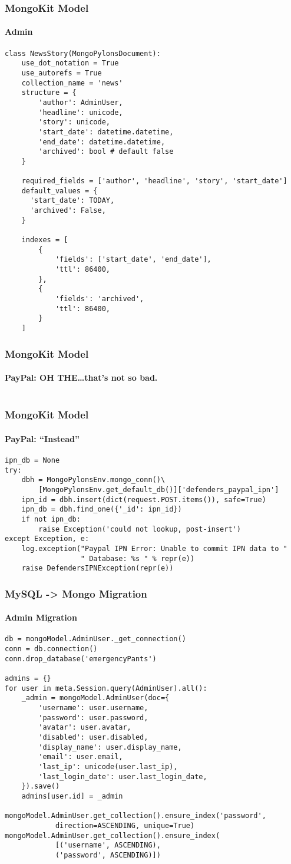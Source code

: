 \documentclass{beamer}
\begin{document}
\begin{frame}[fragile]
\frametitle{MongoKit Model}
\framesubtitle{Admin}
\begin{lstlisting}
class NewsStory(MongoPylonsDocument):
    use_dot_notation = True
    use_autorefs = True
    collection_name = 'news'
    structure = {
        'author': AdminUser,
        'headline': unicode,
        'story': unicode,
        'start_date': datetime.datetime,
        'end_date': datetime.datetime,
        'archived': bool # default false
    }

    required_fields = ['author', 'headline', 'story', 'start_date']
    default_values = {
      'start_date': TODAY,
      'archived': False,
    }

    indexes = [
	    {
	        'fields': ['start_date', 'end_date'],
	        'ttl': 86400,
	    },        
		{
            'fields': 'archived',
            'ttl': 86400,
        }
    ]

\end{lstlisting}
\end{frame}
\begin{frame}[fragile]
\frametitle{MongoKit Model}
\framesubtitle{PayPal: OH THE\dots that's not so bad.}
\begin{lstlisting}
\end{lstlisting}
\end{frame}
\begin{frame}[fragile]
\frametitle{MongoKit Model}
\framesubtitle{PayPal: ``Instead''}
\begin{lstlisting}
ipn_db = None
try:
    dbh = MongoPylonsEnv.mongo_conn()\
        [MongoPylonsEnv.get_default_db()]['defenders_paypal_ipn']
    ipn_id = dbh.insert(dict(request.POST.items()), safe=True)
    ipn_db = dbh.find_one({'_id': ipn_id})
    if not ipn_db:
        raise Exception('could not lookup, post-insert')
except Exception, e:
    log.exception("Paypal IPN Error: Unable to commit IPN data to "
                  " Database: %s " % repr(e))
    raise DefendersIPNException(repr(e))
\end{lstlisting}
\end{frame}
\begin{frame}[fragile]
\frametitle{MySQL -> Mongo Migration}
\framesubtitle{Admin Migration}
\begin{lstlisting}
db = mongoModel.AdminUser._get_connection()
conn = db.connection()
conn.drop_database('emergencyPants')

admins = {}
for user in meta.Session.query(AdminUser).all():
    _admin = mongoModel.AdminUser(doc={
        'username': user.username,
        'password': user.password,
        'avatar': user.avatar,
        'disabled': user.disabled,
        'display_name': user.display_name,
        'email': user.email,
        'last_ip': unicode(user.last_ip),
        'last_login_date': user.last_login_date,
    }).save()
    admins[user.id] = _admin

mongoModel.AdminUser.get_collection().ensure_index('password',
 		 	direction=ASCENDING, unique=True)
mongoModel.AdminUser.get_collection().ensure_index(
			[('username', ASCENDING), 
			('password', ASCENDING)]) 
\end{lstlisting}
\end{frame}
\end{document}
